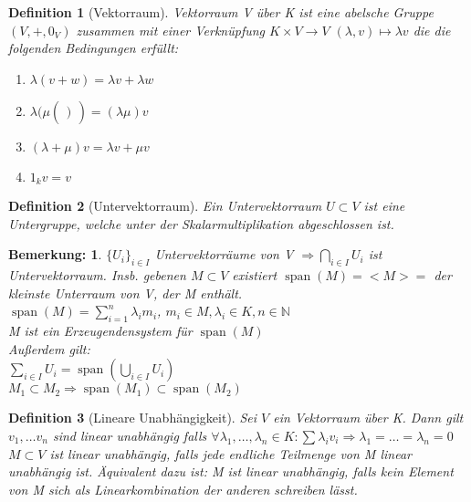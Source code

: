 \documentclass{report}
\newcommand{\lb}{\lambda}
\newcommand{\N}{\mathbb{N}}
\newcommand{\ve}[1]{{\begin{pmatrix}#1 \end{pmatrix}}}
\renewcommand{\v}{\ve}
\DeclareMathOperator{\Span}{span}
\theoremstyle{customrem}
\newtheorem*{bemerkung}{Bemerkung\textnormal:}
\theoremstyle{customdef}
\newtheorem{definition}{Definition}[chapter]
\theoremstyle{customenv}
\begin{document}
\begin{definition}[Vektorraum]
  Vektorraum V \"uber K ist eine abelsche Gruppe \((V, +, 0_V)\) zusammen mit
  einer Verkn\"upfung \(K \times V \to V\) \((\lb, v) \mapsto \lb v\) die die
  folgenden Bedingungen erf\"ullt:\\
  \begin{enumerate}
    \item{\(\lb (v+w) = \lb v + \lb w\)}
    \item{\(\lb(\mu \v) = (\lb \mu) v\)} 
    \item{\((\lb + \mu) v = \lb v + \mu v\)}
    \item{\(1_{k} v = v\)}
  \end{enumerate}
\end{definition}

\begin{definition}[Untervektorraum]
  Ein Untervektorraum \(U \subset V\) ist eine Untergruppe, welche unter der
  Skalarmultiplikation abgeschlossen ist. 
\end{definition}

\begin{bemerkung}
  \(\{U_i\}_{i \in I}\) Untervektorr\"aume von V
  \(\Rightarrow \bigcap_{i\in I} U_{i}\) ist Untervektorraum.
  Insb. gebenen \(M \subset V\) existiert \(\Span(M) = <M> = \) der kleinste
  Unterraum von V, der M enth\"alt.\\
  \(\Span(M) = \sum_{i=1}^{n} \lb_{i} m_{i}\),
  \(m_{i} \in M, \lb_{i} \in K, n \in \N\)\\
  M ist ein Erzeugendensystem f\"ur \(\Span(M)\)\\
  Au\ss{}erdem gilt:\\
  \(\sum_{i\in I}U_{i} = \Span(\bigcup_{i \in I} U_{i})\)\\
  \(M_{1} \subset M_{2} \Rightarrow \Span(M_{1}) \subset \Span(M_{2})\)
\end{bemerkung}

\begin{definition}[Lineare Unabh\"angigkeit]
  Sei \(V\) ein Vektorraum \"uber K. Dann gilt \(v_{1}, \dots v_{n}\) sind
  linear unabh\"angig falls
  \(\forall \lb_{1}, \dots, \lb_{n} \in K : \sum \lb_{i} v_{i} 
  \Rightarrow \lb_{1} = \dots = \lb_{n} = 0\) 
  \(M \subset V\) ist linear unabh\"angig, falls jede endliche Teilmenge von M
  linear unabh\"angig ist. \"Aquivalent dazu ist: M ist linear unabh\"angig, 
  falls kein Element von M sich als Linearkombination der anderen schreiben
  l\"asst.
\end{definition}
\end{document}
